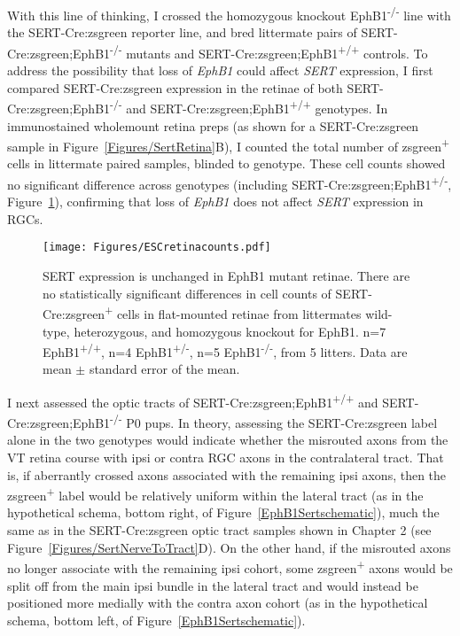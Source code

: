With this line of thinking, I crossed the homozygous knockout EphB1\textsuperscript{-/-} line with the SERT-Cre:zsgreen reporter line, and bred littermate pairs of SERT-Cre:zsgreen;EphB1\textsuperscript{-/-} mutants and SERT-Cre:zsgreen;EphB1\textsuperscript{+/+} controls.
To address the possibility that loss of \emph{EphB1} could affect \emph{SERT} expression, I first compared SERT-Cre:zsgreen expression in the retinae of both SERT-Cre:zsgreen;EphB1\textsuperscript{-/-} and SERT-Cre:zsgreen;EphB1\textsuperscript{+/+} genotypes.
In immunostained wholemount retina preps (as shown for a SERT-Cre:zsgreen sample in Figure~\ref{Figures/SertRetina}B), I counted the total number of zsgreen\textsuperscript{+} cells in littermate paired samples, blinded to genotype.
These cell counts showed no significant difference across genotypes (including SERT-Cre:zsgreen;EphB1\textsuperscript{+/-}, Figure~\ref{ESCretinacounts}), confirming that loss of \emph{EphB1} does not affect \emph{SERT} expression in RGCs.
\begin{figure}[hbtp]
    \begin{center}
        \texttt{[image: Figures/ESCretinacounts.pdf]}
        \caption[SERT expression is unchanged in EphB1 mutant retinae.]
        {SERT expression is unchanged in EphB1 mutant retinae.
		There are no statistically significant differences in cell counts of SERT-Cre:zsgreen\textsuperscript{+} cells in flat-mounted retinae from littermates wild-type, heterozygous, and homozygous knockout for EphB1.
		n=7 EphB1\textsuperscript{+/+}, n=4 EphB1\textsuperscript{+/-}, n=5 EphB1\textsuperscript{-/-}, from 5 litters.
		Data are mean $\pm$ standard error of the mean.
		}
        \label{ESCretinacounts}
    \end{center}
\end{figure}

I next assessed the optic tracts of SERT-Cre:zsgreen;EphB1\textsuperscript{+/+} and SERT-Cre:zsgreen;EphB1\textsuperscript{-/-} P0 pups.
In theory, assessing the SERT-Cre:zsgreen label alone in the two genotypes would indicate whether the misrouted axons from the VT retina course with ipsi or contra RGC axons in the contralateral tract.
That is, if aberrantly crossed axons associated with the remaining ipsi axons, then the zsgreen\textsuperscript{+} label would be relatively uniform within the lateral tract (as in the hypothetical schema, bottom right, of Figure~\ref{EphB1Sertschematic}), much the same as in the SERT-Cre:zsgreen optic tract samples shown in Chapter 2 (see Figure~\ref{Figures/SertNerveToTract}D).
On the other hand, if the misrouted axons no longer associate with the remaining ipsi cohort, some zsgreen\textsuperscript{+} axons would be split off from the main ipsi bundle in the lateral tract and would instead be positioned more medially with the contra axon cohort (as in the hypothetical schema, bottom left, of Figure~\ref{EphB1Sertschematic}).

